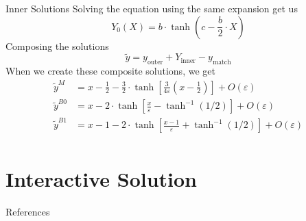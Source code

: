 \begin{frame}{Inner Solutions}
    Solving the equation using the same expansion get us \[
        Y_0(X) = b \cdot \operatorname{tanh}(c - \frac{b}{2}\cdot X)
    \] \pause Composing the solutions \[
        \tilde{y} = y_\text{outer} + Y_\text{inner} - y_\text{match}
    \] \pause
    When we create these composite solutions, we get
        \begin{align*}
            \tilde{y}^{M} &= x - \frac{1}{2} - \frac{3}{2} \cdot \operatorname{tanh}\left[ \frac{3}{4\varepsilon} (x
            - \frac{1}{2}) \right]  + O(\varepsilon)\\
            \tilde{y}^{B0} &= x - 2 \cdot \operatorname{tanh}\left[ \frac{x}{\varepsilon}
            - \operatorname{tanh}^{-1}(1/2) \right] + O(\varepsilon) \\
            \tilde{y}^{B1} &= x - 1 - 2 \cdot \operatorname{tanh}\left[ \frac{x - 1}{\varepsilon}
            + \operatorname{tanh}^{-1}(1/2) \right] + O(\varepsilon) \\
        \end{align*}
\end{frame}

\section{Interactive Solution}%
\label{sec:interactive_solution}

\begin{frame}{References}
    \printbibliography
\end{frame}


